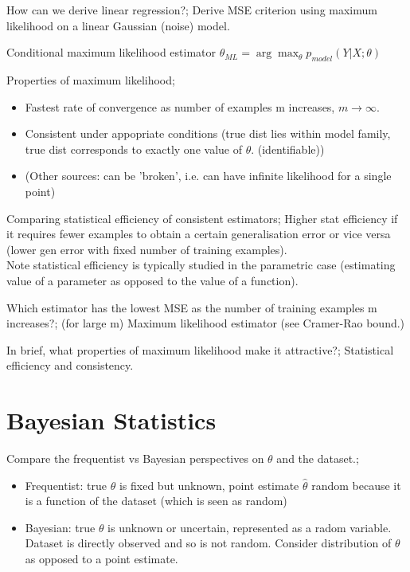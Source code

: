 \documentclass{article}
\begin{document}
How can we derive linear regression?; Derive MSE criterion using maximum likelihood on a linear Gaussian (noise) model.

Conditional maximum likelihood estimator $\theta_{ML} = \arg\max_{\theta} p_{model}(Y | X;\theta)$

Properties of maximum likelihood; \begin{itemize} \item Fastest rate of convergence as number of examples m increases, $m\to\infty$.  \item Consistent under appopriate conditions (true dist lies within model family, true dist corresponds to exactly one value of $\theta$. (identifiable)) \item (Other sources: can be 'broken', i.e. can have infinite likelihood for a single point) \end{itemize}

Comparing statistical efficiency of consistent estimators; Higher stat efficiency if it requires fewer examples to obtain a certain generalisation error or vice versa (lower gen error with fixed number of training examples). \\ Note statistical efficiency is typically studied in the parametric case (estimating value of a parameter as opposed to the value of a function).

Which estimator has the lowest MSE as the number of training examples m increases?; (for large m) Maximum likelihood estimator (see Cramer-Rao bound.)

In brief, what properties of maximum likelihood make it attractive?; Statistical efficiency and consistency.

\section{Bayesian Statistics}

Compare the frequentist vs Bayesian perspectives on $\theta$ and the dataset.; \begin{itemize} \item Frequentist: true $\theta$ is fixed but unknown, point estimate $\hat{\theta}$ random because it is a function of the dataset (which is seen as random) \item Bayesian: true $\theta$ is unknown or uncertain, represented as a radom variable. Dataset is directly observed and so is not random. Consider distribution of $\theta$ as opposed to a point estimate.  \end{itemize} 
\end{document}
